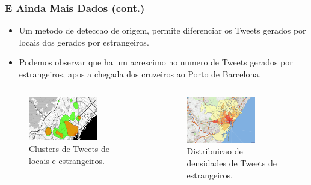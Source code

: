 \documentclass[hyperref={pdfpagelabels=true}]{beamer}
\begin{document}
\begin{frame}
\frametitle{E Ainda Mais Dados (cont.)}

      \begin{itemize}
        \item<2->Um metodo de deteccao de origem, permite diferenciar os Tweets gerados por locais dos gerados por estrangeiros.
        \item<3->Podemos observar que ha um acrescimo no numero de Tweets gerados por estrangeiros, apos a chegada dos cruzeiros ao Porto de Barcelona.
      \end{itemize}                

    \begin{columns}
    \begin{column}{0.5\textwidth}
        \begin{figure}  
            \includegraphics[width=0.7\textwidth]{normal_vs_foreign_CapSetmanaCreuers.png}\\
            \tiny{Clusters de Tweets de locais e estrangeiros.}
        \end{figure}             
    \end{column}
    \begin{column}{0.5\textwidth}
        \begin{figure}  
            \includegraphics[width=0.7\textwidth]{barriosForeignUsersCapSetmanaCreuers_cnt.png}\\
            \tiny{Distribuicao de densidades de Tweets de estrangeiros.}
        \end{figure}  
    \end{column}  
    \end{columns} 

\end{frame}
\end{document}
